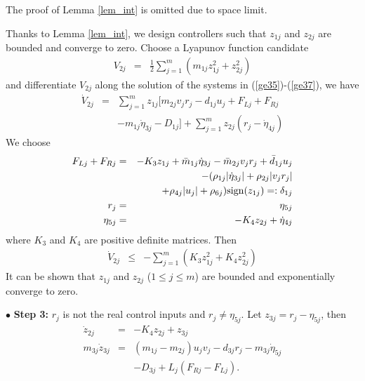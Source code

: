 \documentclass[letterpaper, 10 pt, conference]{ieeeconf}  %
\begin{document}
The proof of Lemma \ref{lem_int} is omitted due to space limit.

Thanks to Lemma \ref{lem_int}, we design controllers such that
$z_{1j}$ and $z_{2j}$ are bounded and converge to zero.
Choose a Lyapunov function candidate
\begin{eqnarray*}
V_{2j}&=&\frac{1}{2}\sum^m_{j=1}(m_{1j}{z}_{1j}^2+{z}_{2j}^2)
\end{eqnarray*}
and differentiate $V_{2j}$ along the solution of the systems in
(\ref{ge35})-(\ref{ge37}), we have
\begin{eqnarray*}
\dot{V}_{2j}&=&\sum^m_{j=1}{z}_{1j}[m_{2j}v_jr_j-d_{1j}u_j+F_{Lj}+F_{Rj}\\
&&
-m_{1j}\dot{{\eta}}_{3j}-D_{1j}]+\sum^m_{j=1}z_{2j}(r_j-\dot{\eta}_{4j})
\end{eqnarray*}
We choose
\begin{eqnarray}
F_{Lj}+F_{Rj}&=&-K_{3}z_{1j}+\bar{m}_{1j}\dot{{\eta}}_{3j}-\bar{m}_{2j}v_jr_j+\bar{d}_{1j}u_j\nonumber\\
&&-(\rho_{1j}|\dot{{\eta}}_{3j}|+\rho_{2j}|v_jr_j|\nonumber\\
&&+\rho_{4j}|u_j|+\rho_{6j}){\rm sign}(z_{1j})
=:\delta_{1j}\label{gcontrol1}\\
r_j&=&\eta_{5j}\\
\eta_{5j}&=&-K_4z_{2j}+\dot{\eta}_{4j}\label{geta5j}
\end{eqnarray}
where $K_{3}$ and $K_{4}$ are positive definite matrices.
 Then
\begin{eqnarray*}
\dot{V}_{2j}%
&\leq & -\sum^m_{j=1}(K_{3}z^2_{1j}+K_{4}z^2_{2j})
\end{eqnarray*}
It can be shown
that  $z_{1j}$ and $z_{2j}$ ($1\leq j\leq m$) are bounded and
exponentially converge to zero.


$\bullet$ {\bf Step 3:} $r_j$ is not the real control inputs and
$r_j\not=\eta_{5j}$. Let
$z_{3j}=r_j-\eta_{5j}$,
then
\begin{eqnarray}
\dot{z}_{2j}&=&-K_4z_{2j}+z_{3j}\label{ge36qd}\\
m_{3j}\dot{z}_{3j}&=&(m_{1j}-m_{2j})u_jv_j-d_{3j}r_j-m_{3j}\dot{\eta}_{5j}\nonumber\\
&&-D_{3j}+L_j(F_{Rj}-F_{Lj}). \label{ge37d}
\end{eqnarray}
\end{document}
